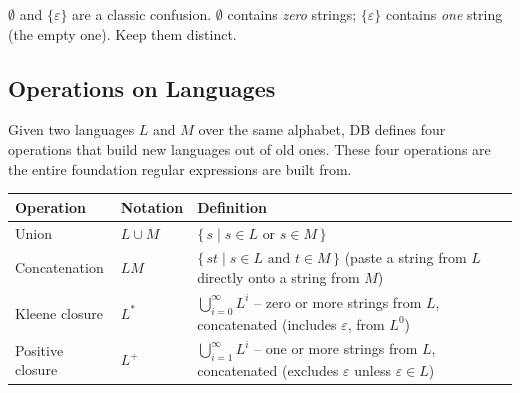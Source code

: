 \documentclass[full-course-notes.tex]{subfiles}
\begin{document}
\begin{examfocus}
$\emptyset$ and $\{\varepsilon\}$ are a classic confusion. $\emptyset$ contains \emph{zero}
strings; $\{\varepsilon\}$ contains \emph{one} string (the empty one). Keep them distinct.
\end{examfocus}

\subsection{Operations on Languages}
\label{sec:l4-operations-on-languages}

\dbtag Given two languages $L$ and $M$ over the same alphabet, DB defines four operations that
build new languages out of old ones. These four operations are the entire foundation regular
expressions are built from.

\begin{center}
\renewcommand{\arraystretch}{1.35}
\begin{tabularx}{\textwidth}{@{}l l X@{}}
\toprule
\textbf{Operation} & \textbf{Notation} & \textbf{Definition} \\
\midrule
Union & $L \cup M$ & $\{\, s \mid s \in L \text{ or } s \in M \,\}$ \\
Concatenation & $LM$ & $\{\, st \mid s \in L \text{ and } t \in M \,\}$ (paste a string from $L$
directly onto a string from $M$) \\
Kleene closure & $L^{*}$ & $\bigcup_{i=0}^{\infty} L^{i}$ -- zero or more strings from $L$,
concatenated (includes $\varepsilon$, from $L^0$) \\
Positive closure & $L^{+}$ & $\bigcup_{i=1}^{\infty} L^{i}$ -- one or more strings from $L$,
concatenated (excludes $\varepsilon$ unless $\varepsilon \in L$) \\
\bottomrule
\end{tabularx}
\end{center}
\end{document}
